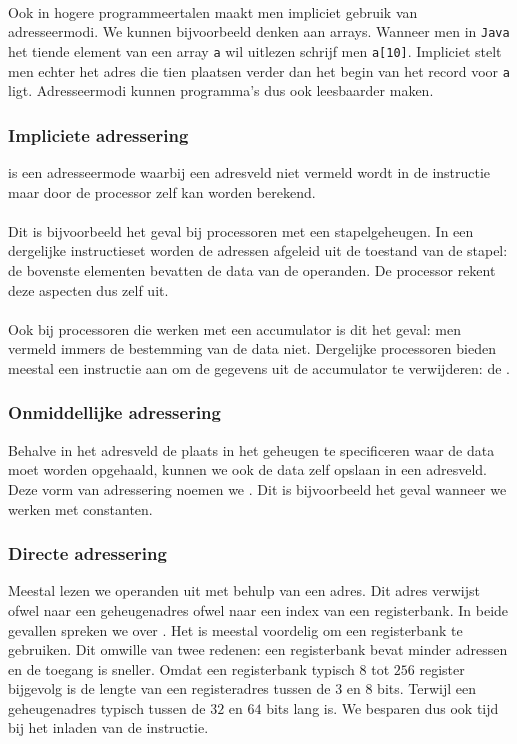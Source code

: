 \paragraph{}
Ook in hogere programmeertalen maakt men impliciet gebruik van adresseermodi. We kunnen bijvoorbeeld denken aan arrays. Wanneer men in \verb+Java+ het tiende element van een array \verb+a+ wil uitlezen schrijf men \verb+a[10]+. Impliciet stelt men echter het adres die tien plaatsen verder dan het begin van het record voor \verb+a+ ligt. Adresseermodi kunnen programma's dus ook leesbaarder maken.
\subsubsection{Impliciete adressering}
 is een adresseermode waarbij een adresveld niet vermeld wordt in de instructie maar door de processor zelf kan worden berekend.
\paragraph{}
Dit is bijvoorbeeld het geval bij processoren met een stapelgeheugen. In een dergelijke instructieset worden de adressen afgeleid uit de toestand van de stapel: de bovenste elementen bevatten de data van de operanden. De processor rekent deze aspecten dus zelf uit.
\paragraph{}
Ook bij processoren die werken met een accumulator is dit het geval: men vermeld immers de bestemming van de data niet. Dergelijke processoren bieden meestal een instructie aan om de gegevens uit de accumulator te verwijderen: de .
\subsubsection{Onmiddellijke adressering}
Behalve in het adresveld de plaats in het geheugen te specificeren waar de data moet worden opgehaald, kunnen we ook de data zelf opslaan in een adresveld. Deze vorm van adressering noemen we . Dit is bijvoorbeeld het geval wanneer we werken met constanten.
\subsubsection{Directe adressering}
Meestal lezen we operanden uit met behulp van een adres. Dit adres verwijst ofwel naar een geheugenadres ofwel naar een index van een registerbank. In beide gevallen spreken we over . Het is meestal voordelig om een registerbank te gebruiken. Dit omwille van twee redenen: een registerbank bevat minder adressen en de toegang is sneller. Omdat een registerbank typisch $8$ tot $256$ register bijgevolg is de lengte van een registeradres tussen de $3$ en $8$ bits. Terwijl een geheugenadres typisch tussen de $32$ en $64$ bits lang is. We besparen dus ook tijd bij het inladen van de instructie.
